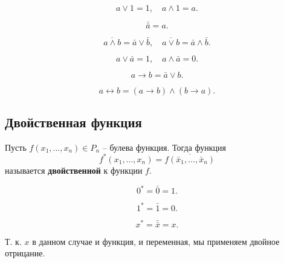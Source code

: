 \begin{property}
    \[
        a \lor 1 = 1,
        \quad
        a \land 1 = a.
    \]
\end{property}

\begin{property}[Инволютивность]
    \[
        \bar{\bar{a}} = a.
    \]
\end{property}

\begin{property}
    \[
        \overline{a \land b} = \bar{a} \lor \bar{b},
        \quad
        \overline{a \lor b} = \bar{a} \land \bar{b}.
    \]
\end{property}

\begin{property}
    \[
        a \lor \bar{a} = 1,
        \quad
        a \land \bar{a} = 0.
    \]
\end{property}

\begin{property}
    \[
        a \to b = \bar{a} \lor b.
    \]
\end{property}

\begin{property}
    \[
        a \leftrightarrow b = (a \to b) \land (b \to a).
    \]
\end{property}

\subsection{Двойственная функция}

Пусть \(f(x_1, \ldots, x_n) \in P_n\) -- булева функция. Тогда функция
\[
    f^*(x_1, \ldots, x_n) = \overline{f(\bar{x}_1, \ldots, \bar{x}_n)}
\]
называется \textbf{двойственной} к функции \(f\).

\begin{example}
    \[
        0^* = \bar{0} = 1.
    \]
\end{example}

\begin{example}
    \[
        1^* = \bar{1} = 0.
    \]
\end{example}

\begin{example}
    \[
        x^* = \bar{\bar{x}} = x.
    \]

    Т. к. \(x\) в данном случае и функция, и переменная, мы применяем двойное отрицание.
\end{example}


